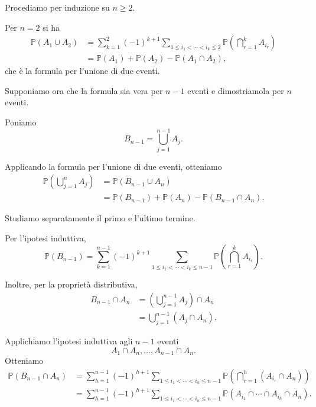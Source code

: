 \documentclass[a4paper]{article}
\begin{document}
\begin{snippetproof}{}
    Procediamo per induzione su \(n \geq 2\).

    Per \(n=2\) si ha
    \begin{align*}
        \mathbb{P}(A_1 \cup A_2)
        &=
        \sum_{k=1}^{2}
        (-1)^{k+1}
        \sum_{1 \leq i_1 < \cdots < i_k \leq 2}
        \mathbb{P}\left(
            \bigcap_{r=1}^{k} A_{i_r}
        \right)
        \\
        &=
        \mathbb{P}(A_1)
        +
        \mathbb{P}(A_2)
        -
        \mathbb{P}(A_1 \cap A_2),
    \end{align*}
    che è la formula per l'unione di due eventi.

    Supponiamo ora che la formula sia vera per \(n-1\) eventi
    e dimostriamola per \(n\) eventi.

    Poniamo
    \[
        B_{n-1}
        =
        \bigcup_{j=1}^{n-1} A_j.
    \]

    Applicando la formula per l'unione di due eventi, otteniamo
    \begin{align*}
        \mathbb{P}\left(
            \bigcup_{j=1}^{n} A_j
        \right)
        &=
        \mathbb{P}(B_{n-1} \cup A_n)
        \\
        &=
        \mathbb{P}(B_{n-1})
        +
        \mathbb{P}(A_n)
        -
        \mathbb{P}(B_{n-1} \cap A_n).
    \end{align*}

    Studiamo separatamente il primo e l'ultimo termine.

    Per l'ipotesi induttiva,
    \[
        \mathbb{P}(B_{n-1})
        =
        \sum_{k=1}^{n-1}
        (-1)^{k+1}
        \sum_{1 \leq i_1 < \cdots < i_k \leq n-1}
        \mathbb{P}\left(
            \bigcap_{r=1}^{k} A_{i_r}
        \right).
    \]

    Inoltre, per la proprietà distributiva,
    \begin{align*}
        B_{n-1} \cap A_n
        &=
        \left(
            \bigcup_{j=1}^{n-1} A_j
        \right)
        \cap A_n
        \\
        &=
        \bigcup_{j=1}^{n-1}
        (A_j \cap A_n).
    \end{align*}

    Applichiamo l'ipotesi induttiva agli \(n-1\) eventi
    \[
        A_1 \cap A_n,\ldots,A_{n-1} \cap A_n.
    \]
    Otteniamo
    \begin{align*}
        \mathbb{P}(B_{n-1} \cap A_n)
        &=
        \sum_{h=1}^{n-1}
        (-1)^{h+1}
        \sum_{1 \leq i_1 < \cdots < i_h \leq n-1}
        \mathbb{P}\left(
            \bigcap_{r=1}^{h}
            (A_{i_r} \cap A_n)
        \right)
        \\
        &=
        \sum_{h=1}^{n-1}
        (-1)^{h+1}
        \sum_{1 \leq i_1 < \cdots < i_h \leq n-1}
        \mathbb{P}\left(
            A_{i_1}
            \cap \cdots \cap
            A_{i_h}
            \cap A_n
        \right).
    \end{align*}


\end{snippetproof}
\end{document}
